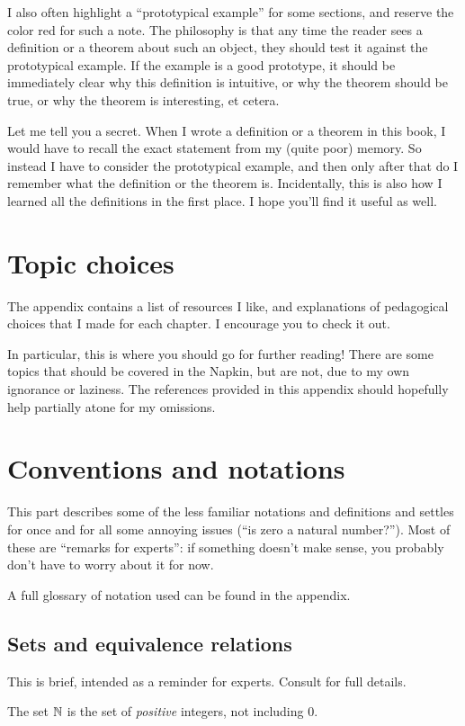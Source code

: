 I also often highlight a ``prototypical example'' for some sections,
and reserve the color red for such a note.
The philosophy is that any time the reader sees a definition
or a theorem about such an object, they should test it
against the prototypical example.
If the example is a good prototype, it should be immediately clear
why this definition is intuitive, or why the theorem should be true,
or why the theorem is interesting, et cetera.

Let me tell you a secret.  When I wrote a definition or a theorem in this book,
I would have to recall the exact statement from my (quite poor) memory. 
So instead I have to consider the prototypical example,
and then only after that do I remember what the definition or the theorem is.
Incidentally, this is also how I learned all the definitions in the first place.
I hope you'll find it useful as well.

\section{Topic choices}
The appendix contains a list of resources I like,
and explanations of pedagogical choices that I made for each chapter.
I encourage you to check it out.

In particular, this is where you should go for further reading!
There are some topics that should be covered in the Napkin,
but are not, due to my own ignorance or laziness.
The references provided in this appendix should hopefully help partially
atone for my omissions.

\section{Conventions and notations}
This part describes some of the less familiar notations and definitions
and settles for once and for all some annoying issues (``is zero a natural number?'').
Most of these are ``remarks for experts'':
if something doesn't make sense, you probably don't have to worry about it for now.

A full glossary of notation used can be found in the appendix.

\subsection*{Sets and equivalence relations}
This is brief, intended as a reminder for experts.
Consult  for full details.

The set $\mathbb N$ is the set of \emph{positive} integers, not including $0$.

